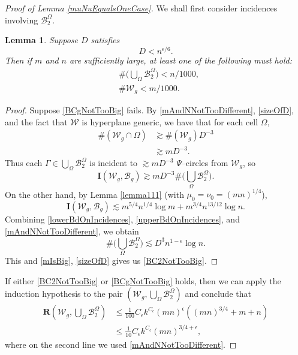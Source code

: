 \documentclass[reqno]{amsart}
\newtheorem{lem}[thm]{Lemma}
\theoremstyle{definition}
\theoremstyle{remark}
\theoremstyle{remark}
\newcommand{\incidences}{\mathbf I}
\newcommand{\WC}{\mathcal W}
\newcommand{\BC}{\mathcal B}
\newcommand{\rect}{\mathbf{R}}
\begin{document}
\begin{proof}[Proof of Lemma \ref{muNuEqualsOneCase}]
We shall first consider incidences involving $\BC^\Omega_2$.
\begin{lem}\label{BC2SmallOrWcgSmall}
Suppose $D$ satisfies
\begin{equation}\label{sizeOfD}
D < n^{\epsilon/6}.
\end{equation}
Then if $m$ and $n$ are sufficiently large, at least one of the following must hold:
\begin{align}
&\#\Big(\bigcup_{\Omega} \BC_2^\Omega\Big) < n/1000,\label{BC2NotTooBig}\\
&\#\WC_g < m/1000\label{BCgNotTooBig}.
\end{align}
\end{lem}
\begin{proof}
Suppose \eqref{BCgNotTooBig} fails. By \eqref{mAndNNotTooDifferent}, \eqref{sizeOfD}, and the fact that $\WC$ is hyperplane generic, we have that for each cell $\Omega,$
\begin{equation*}
\begin{split}
\#(\WC_g\cap\Omega)&\gtrsim \#(\WC_g)D^{-3}\\
&\gtrsim mD^{-3}.
\end{split}
\end{equation*}
Thus each $\Gamma\in\bigcup_{\Omega} \BC_2^\Omega$ is incident to $\gtrsim mD^{-3}$ $\Psi$--circles from $\WC_g$, so
\begin{equation}\label{lowerBdOnIncidences}
\incidences(\WC_g,\BC_g) \gtrsim  m D^{-3} \#\Big(\bigcup_{\Omega} \BC_2^\Omega\Big).
\end{equation}
On the other hand, by Lemma \ref{lemma111} (with $\mu_0=\nu_0=(mn)^{1/4}$),
\begin{equation}\label{upperBdOnIncidences}
\incidences(\WC_g,\BC_g) \lesssim m^{5/4}n^{1/4}\log m + m^{3/4}n^{13/12}\log n.
\end{equation}
Combining \eqref{lowerBdOnIncidences}, \eqref{upperBdOnIncidences}, and \eqref{mAndNNotTooDifferent}, we obtain
\begin{equation}
 \#\Big(\bigcup_{\Omega} \BC_2^\Omega\Big) \lesssim D^3 n^{1-\epsilon}\log n.
\end{equation}
This and \eqref{mIsBig}, \eqref{sizeOfD} gives us \eqref{BC2NotTooBig}.
\end{proof}

If either \eqref{BC2NotTooBig} or \eqref{BCgNotTooBig} holds, then we can apply the induction hypothesis to the pair $(\WC_g, \bigcup_{\Omega} \BC_2^\Omega)$ and conclude that
\begin{equation}\label{controlWCgBC2}
\begin{split}
\rect(\WC_g, \bigcup_{\Omega} \BC_2^\Omega) &\leq \frac{1}{100}C_{\epsilon}k^{C_{\epsilon}}(mn)^{\epsilon}((mn)^{3/4}+m+n)\\
&\leq \frac{1}{10}C_{\epsilon}k^{C_{\epsilon}}(mn)^{3/4+\epsilon},
\end{split}
\end{equation}
where on the second line we used \eqref{mAndNNotTooDifferent}.


\end{proof}
\end{document}
